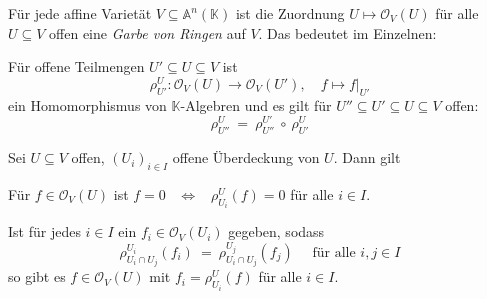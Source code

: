 \documentclass[11pt]{book}
\theoremstyle{nonumberbreak}
\newenvironment{propdefin}[1][]{\ifthenelse{\equal{#1}{}}{\propdefini}{\propdefini[#1]}\rm}{\endpropdefini}
\begin{document}
\begin{spacing}{1.3}
\begin{propdefin} %

Für jede affine Varietät $V \subseteq \mathbb{A}^n(\mathbb{K})$ ist die Zuordnung $U \mapsto \mathcal{O}_V(U)$ für alle $U \subseteq V$ offen eine \textit{Garbe von Ringen} auf $V$. Das bedeutet im Einzelnen:
\begin{compactenum}
\item  Für offene Teilmengen $U' \subseteq U \subseteq V$ ist 
$$\rho^{U}_{U'}: \mathcal{O}_V(U) \longrightarrow \mathcal{O}_V(U'), \quad f \mapsto f\vert _{U'}$$
ein Homomorphismus von $\mathbb{K}$-Algebren und es gilt für $U''\subseteq U'\subseteq U \subseteq V$ offen:
$$\rho^{U}_{U''} \ =\ \rho^{U'}_{U''} \ \circ\ \rho^{U}_{U'}$$
\item Sei $U \subseteq V$ offen, $(U_i)_{i \in I}$ offene Überdeckung von $U$. Dann gilt
\begin{compactenum}
\item Für $f \in \mathcal{O}_V(U)$ ist $f=0$ \ $\Longleftrightarrow$ \ $\rho^{U}_{U_i}(f)=0$ für alle $i \in I$.
\item Ist für jedes $i \in I$ ein $f_i \in \mathcal{O}_V(U_i)$ gegeben, sodass
$$\rho^{U_i}_{U_i \cap U_j} (f_i) \ = \ \rho^{U_j}_{U_i \cap U_j} (f_j) \quad \textrm{ für alle } i,j \in I$$
so gibt es $f \in \mathcal{O}_V(U)$ mit $f_i=\rho^{U}_{U_i}(f)$ für alle $i \in I$.  
\end{compactenum}

\end{compactenum}
\end{propdefin}



\end{spacing}
\end{document}
